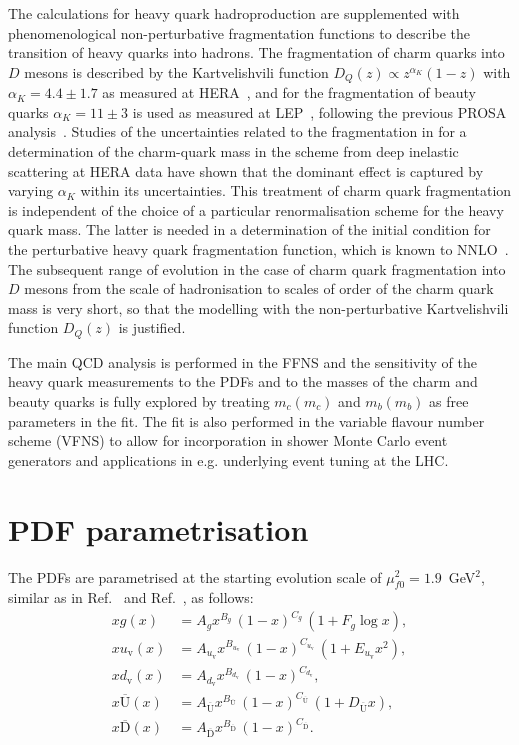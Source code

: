 The calculations for heavy quark hadroproduction are supplemented with phenomenological non-perturbative fragmentation 
functions to describe the transition of heavy quarks into hadrons. The fragmentation of charm quarks into $D$ mesons is 
described by the Kartvelishvili function $D_Q(z) \propto z^{\alpha_K}(1-z)$ 
with $\alpha_K = 4.4 \pm 1.7$ as measured at HERA~\cite{Aaron:2008ac,Chekanov:2008ur}, 
and for the fragmentation of beauty quarks $\alpha_K = 11 \pm 3$ is used as measured at LEP~\cite{Nason:1999zj}, following 
the previous PROSA analysis~\cite{Zenaiev:2015rfa}.
Studies of the uncertainties related to the fragmentation in \cite{Alekhin:2012un} 
for a determination of the charm-quark mass in the \msbar scheme from
deep inelastic scattering at HERA data have shown that the dominant effect is
captured by varying $\alpha_K$ within its uncertainties. 
This treatment of charm quark fragmentation is independent of the choice of a particular renormalisation scheme for the heavy quark mass. 
The latter is needed in a determination of the initial condition for the perturbative heavy quark fragmentation
function, which is known to NNLO~\cite{Melnikov:2004bm}.
The subsequent range of evolution in the case of charm quark fragmentation
into $D$ mesons from the scale of hadronisation to scales of order of the
charm quark mass is very short, so that the modelling with the non-perturbative Kartvelishvili function $D_Q(z)$ is justified.

The main QCD analysis is performed in the FFNS and the sensitivity of the heavy quark measurements to the PDFs and to the masses 
of the charm and beauty quarks is fully explored by treating $m_c(m_c)$ and $m_b(m_b)$ as free parameters in the fit.
The fit is also performed in the variable flavour number scheme (VFNS) to allow for incorporation in shower Monte Carlo event generators and applications in e.g. 
underlying event tuning at the LHC.


\section{PDF parametrisation}
\label{sec:pdfparam}

The PDFs are parametrised at the starting evolution scale of $\mu^2_{f0} = 1.9$~GeV$^2$, similar as in Ref.~\cite{Abramowicz:2015mha} and Ref.~\cite{Bonvini:2019wxf}, as follows:
\begin{equation}\begin{aligned}
xg(x) &= A_{g} x^{B_{g}}\,(1-x)^{C_{g}}\, (1 + F_{g} {\log x}),\\
xu_\mathrm{v}(x) &= A_{u_\mathrm{v}}x^{B_{u_\mathrm{v}}}\,(1-x)^{C_{u_\mathrm{v}}}\,(1+E_{u_\mathrm{v}}x^2) ,\\
xd_\mathrm{v}(x) &= A_{d_\mathrm{v}}x^{B_{d_\mathrm{v}}}\,(1-x)^{C_{d_\mathrm{v}}},\\
x\overline{\mathrm{U}}(x)&= A_{\overline{\mathrm{U}}}x^{B_{\overline{\mathrm{U}}}}\, (1-x)^{C_{\overline{\mathrm{U}}}}\, (1+D_{\overline{\mathrm{U}}}x), \\
x\overline{\mathrm{D}}(x)&= A_{\overline{\mathrm{D}}}x^{B_{\overline{\mathrm{D}}}}\, (1-x)^{C_{\overline{\mathrm{D}}}}.
\end{aligned}
\label{eq:dv}
\end{equation}

